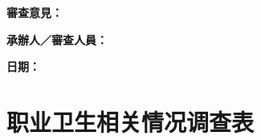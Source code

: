 \documentclass[UTF8,10pt,a4paper,fontset=fandol]{ctexart}
\newcommand{\fieldvalue}[1]{#1}
\newcommand{\handwritten}[1]{#1}
\begin{document}
\vspace{4pt}

\noindent
\textbf{審查意見：}
\\[-2pt]
\noindent
\fieldvalue{\handwritten{}}

\vspace{6pt}

\noindent
\textbf{承辦人／審查人員：}
\fieldvalue{\handwritten{}}

\noindent
\textbf{日期：}
\fieldvalue{\handwritten{}}


\newpage

\section*{职业卫生相关情况调查表}
\end{document}
